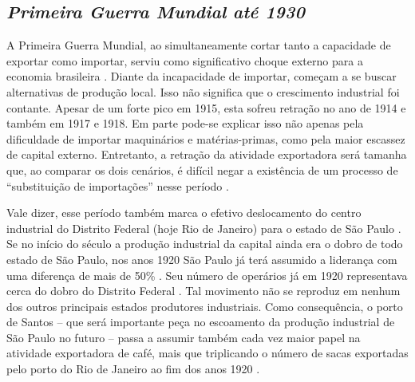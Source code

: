 \subsection{\emph{Primeira Guerra Mundial até 1930}}
A Primeira Guerra Mundial, ao simultaneamente cortar tanto a capacidade
de exportar como importar, serviu como significativo choque externo para
a economia brasileira
\citep{furtado2005,mello1982,pradojunior2012,suzigan2000}. Diante da incapacidade de
importar, começam a se buscar alternativas de produção local. Isso não
significa que o crescimento industrial foi contante. Apesar de um forte
pico em 1915, esta sofreu retração no ano de 1914 e também em 1917 e
1918. Em parte pode-se explicar isso não apenas pela dificuldade de
importar maquinários e matérias-primas, como pela maior escassez de
capital externo. Entretanto, a retração da atividade exportadora
será tamanha que, ao comparar os dois cenários, é difícil negar a
existência de um processo de ``substituição de importações'' nesse período
\citep{loureiro_industrializacao_2006,tavares1973}.


Vale dizer, esse período também marca o efetivo deslocamento do centro
industrial do Distrito Federal (hoje Rio de Janeiro) para o estado de
São Paulo \cite{pereira_da_silva_as_2024,suzigan_industrializacao_2000}.
Se no início do século a produção industrial da
capital ainda era o dobro de todo estado de São Paulo, nos anos 1920 São
Paulo já terá assumido a liderança com uma diferença de mais de 50\%
\cite{saraiva_atlas_nodate}.
Seu número de operários já em 1920 representava cerca do
dobro do Distrito Federal .
Tal movimento não se reproduz em nenhum dos
outros principais estados produtores industriais. Como consequência, o
porto de Santos -- que será importante peça no escoamento da produção
industrial de São Paulo no futuro -- passa a assumir também cada vez
maior papel na atividade exportadora de café, mais que triplicando o
número de sacas exportadas pelo porto do Rio de Janeiro ao fim dos anos
1920 \cite{lanna_casas_2019}.

